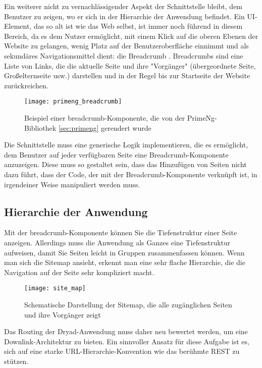 Ein weiterer nicht zu vernachlässigender Aspekt der Schnittstelle bleibt, dem Benutzer zu zeigen, wo er sich in der Hierarchie der Anwendung befindet.
Ein UI-Element, das so alt ist wie das Web selbst, ist immer noch führend in diesem Bereich, da es dem Nutzer ermöglicht, mit einem Klick auf die oberen Ebenen der Website zu gelangen, wenig Platz auf der Benutzeroberfläche einnimmt und als sekundäres Navigationsmittel dient: die Breadcrumb \cite{breadcrumb}.
Breadcrumbs sind eine Liste von Links, die die aktuelle Seite und ihre "Vorgänger" (übergeordnete Seite, Großelternseite usw.) darstellen und in der Regel bis zur Startseite der Website zurückreichen.

\begin{figure}[H]
  \centering
  \texttt{[image: primeng\_breadcrumb]}
  \caption{Beispiel einer breadcrumb-Komponente, die von der PrimeNg-Bibliothek \ref{sec:primeng} gerendert wurde}
  \label{fig:primeng_breadcrumb}
\end{figure}

Die Schnittstelle muss eine generische Logik implementieren, die es ermöglicht, dem Benutzer auf jeder verfügbaren Seite eine Breadcrumb-Komponente anzuzeigen.
Diese muss so gestaltet sein, dass das Hinzufügen von Seiten nicht dazu führt, dass der Code, der mit der Breadcrumb-Komponente verknüpft ist, in irgendeiner Weise manipuliert werden muss.

\subsection{Hierarchie der Anwendung} \label{sec:hierarchie_anwendung}

Mit der breadcrumb-Komponente können Sie die Tiefenstruktur einer Seite anzeigen.
Allerdings muss die Anwendung als Ganzes eine Tiefenstruktur aufweisen, damit Sie Seiten leicht in Gruppen zusammenfassen können.
Wenn man sich die Sitemap ansieht, erkennt man eine sehr flache Hierarchie, die die Navigation auf der Seite sehr kompliziert macht.

\begin{figure}[H]
  \centering
  \texttt{[image: site\_map]}
  \caption{Schematische Darstellung der Sitemap, die alle zugänglichen Seiten und ihre Vorgänger zeigt}
  \label{fig:site_map}
\end{figure}

Das Routing der Dryad-Anwendung muss daher neu bewertet werden, um eine Downlink-Architektur zu bieten.
Ein sinnvoller Ansatz für diese Aufgabe ist es, sich auf eine starke URL-Hierarchie-Konvention wie das berühmte \ac{REST} zu stützen.

